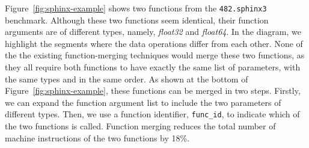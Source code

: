 Figure~\ref{fig:sphinx-example} shows two functions from the \texttt{482.sphinx3} benchmark. Although these two functions seem identical,
their function arguments are of different types, namely, \textit{float32} and \textit{float64}. In the diagram, we highlight the segments
where the data operations differ from each other. None of the the existing function-merging techniques would merge these two functions, as
they all require both functions to have exactly the same list of parameters, with the same types and in the same order. As shown at the
bottom of Figure~\ref{fig:sphinx-example}, these functions can be merged in two steps. Firstly, we can expand the function argument list to
include the two parameters of different types. Then, we use a function identifier, \texttt{func\_id}, to indicate which of the two
functions is called. Function merging reduces the total number of machine instructions of the two functions by 18\%.


